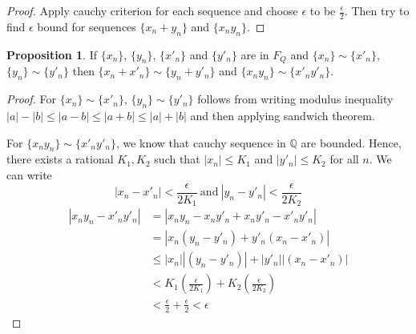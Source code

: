 \documentclass[12pt]{report}
\theoremstyle{definition}
\newtheorem{prop}{Proposition}
\begin{document}
\begin{proof}
    Apply cauchy criterion for each sequence and choose $\epsilon$ to be $\frac{\epsilon}{2}$. Then try to find $\epsilon$ bound for sequences $\{x_n + y_n\}$ and $\{x_ny_n\}$.
\end{proof}
\begin{prop}
    If $\{x_n\}$, $\{y_n\}$, $\{x'_n\}$ and $\{y'_n\}$ are in $F_Q$ and $\{x_n\}\sim \{x'_n\}$, $\{y_n\}\sim \{y'_n\}$ then $\{x_n + x'_n\}\sim \{y_n + y'_n\}$ and $\{x_ny_n\} \sim \{x'_ny'_n\}$.
\end{prop}
\begin{proof}
    For $\{x_n\}\sim \{x'_n\}$, $\{y_n\}\sim \{y'_n\}$ follows from writing modulus inequality $|a| - |b| \leq |a-b| \leq |a+b| \leq |a| + |b|$ and then applying sandwich theorem.

    For $\{x_ny_n\} \sim \{x'_ny'_n\}$, we know that cauchy sequence in $\mathbb{Q}$ are bounded. Hence, there exists a rational $K_1,K_2$ such that $|x_n| \leq K_1$ and $|y'_n| \leq K_2$ for all $n$. We can write 
    $$ |x_n - x'_n| < \frac{\epsilon}{2K_1}~\text{and}~|y_n - y'_n| < \frac{\epsilon}{2K_2}$$
    \begin{align*}
        |x_ny_n - x'_ny'_n| &= |x_ny_n - x_ny'_n + x_ny'_n - x'_ny'_n|\\
        &= |x_n(y_n - y'_n) + y'_n(x_n - x'_n)|\\
        &\leq |x_n||(y_n - y'_n) | + |y'_n||(x_n - x'_n)|\\
        &< K_1\left(\frac{\epsilon}{2K_1}\right) + K_2\left(\frac{\epsilon}{2K_2}\right)\\
        &< \frac{\epsilon}{2} + \frac{\epsilon}{2} < \epsilon
    \end{align*}
\end{proof}
\end{document}
